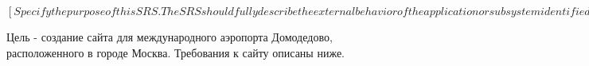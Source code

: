 $[Specify the purpose of this SRS. The SRS should 
fully describe the external behavior of the 
application or subsystem identified. It also 
describes nonfunctional requirements, design 
constraints and other factors necessary to 
provide a complete and comprehensive description 
of the requirements for the software.]$

Цель - создание сайта для международного
аэропорта Домодедово, расположенного в 
городе Москва. Требования к сайту описаны ниже.

